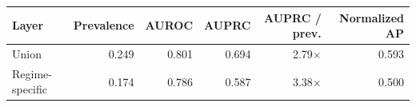 \begin{tabular}{lrrrrr}
\toprule
Layer & Prevalence & AUROC & AUPRC & AUPRC / prev. & Normalized AP \\
\midrule
Union & 0.249 & 0.801 & 0.694 & 2.79$\times$ & 0.593 \\
Regime-specific & 0.174 & 0.786 & 0.587 & 3.38$\times$ & 0.500 \\
\bottomrule
\end{tabular}
